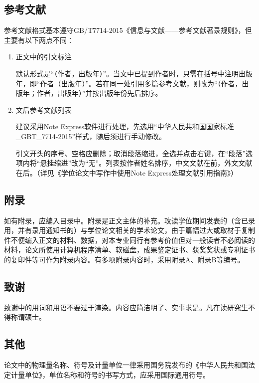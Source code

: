 \subsection{参考文献}

参考文献格式基本遵守GB/T7714-2015《信息与文献——参考文献著录规则》，但主要有以下两点不同：

\begin{enumerate}
  \item 正文中的引文标注
  
  默认形式是“（作者，出版年）”。当文中已提到作者时，只需在括号中注明出版年，即“作者（出版年）”。若在同一处引用多篇参考文献，则改为“（作者，出版年；作者，出版年）”并按出版年份先后排序。
  
  \item 文后参考文献列表
  
  建议采用Note Express软件进行处理，先选用“中华人民共和国国家标准\_GBT\_7714-2015”样式，随后须进行手动修改。
  
  引文开头的序号、空格应删除；取消段落缩进，全选并点击右键，在“段落”选项内将“悬挂缩进”改为“无”。列表按作者姓名排序，中文文献在前，外文文献在后。（详见《学位论文中写作中使用Note Express处理文献引用指南》）
  
\end{enumerate}

\subsection{附录}

如有附录，应编入目录中。附录是正文主体的补充。攻读学位期间发表的（含已录用，并有录用通知书的）与学位论文相关的学术论文，由于篇幅过大或取材于复制件不便编入正文的材料、数据，对本专业同行有参考价值但对一般读者不必阅读的材料，论文所使用计算机程序清单、软磁盘，成果鉴定证书、获奖奖状或专利证书的复印件等可作为附录内容。有多项附录内容时，采用附录A、附录B等编号。

\subsection{致谢}

致谢中的用词和用语不要过于渲染。内容应简洁明了、实事求是。凡在读研究生不得称谓硕士。

\subsection{其他}

论文中的物理量名称、符号及计量单位一律采用国务院发布的《中华人民共和国法定计量单位》，单位名称和符号的书写方式，应采用国际通用符号。

